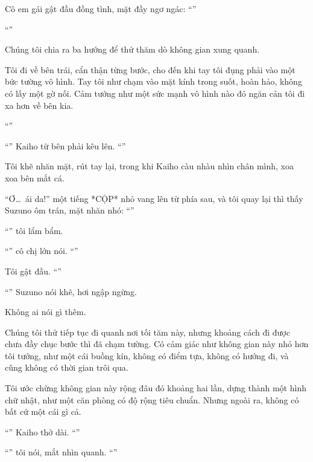 \documentclass[../main.tex]{subfiles}
\begin{document}
Cô em gái gật đầu đồng tình, mặt đầy ngơ ngác: ``''

``''

Chúng tôi chia ra ba hướng để thử thăm dò không gian xung quanh.

Tôi đi về bên trái, cẩn thận từng bước, cho đến khi tay tôi đụng phải vào một bức tường vô hình. Tay tôi như chạm vào mặt kính trong suốt, hoàn hảo, không có lấy một gờ nối. Cảm tưởng như một sức mạnh vô hình nào đó ngăn cản tôi đi xa hơn về bên kia.

``''

``'' Kaiho từ bên phải kêu lên. ``''

Tôi khẽ nhăn mặt, rút tay lại, trong khi Kaiho càu nhàu nhìn chân mình, xoa xoa bên mắt cá.

``Ơ\dots\ ái da!'' một tiếng *CỘP* nhỏ vang lên từ phía sau, và tôi quay lại thì thấy Suzuno ôm trán, mặt nhăn nhó: ``''

``'' tôi lẩm bẩm.

``'' cô chị lớn nói. ``''

Tôi gật đầu. ``''

``'' Suzuno nói khẽ, hơi ngập ngừng.

Không ai nói gì thêm.

Chúng tôi thử tiếp tục đi quanh nơi tối tăm này, nhưng khoảng cách đi được chưa đầy chục bước thì đã chạm tường. Có cảm giác như không gian này nhỏ hơn tôi tưởng, như một cái buồng kín, không có điểm tựa, không có hướng đi, và cũng không có thời gian trôi qua.

Tôi ước chừng không gian này rộng đâu đó khoảng hai lần, dựng thành một hình chữ nhật, như một căn phòng có độ rộng tiêu chuẩn. Nhưng ngoài ra, không có bất cứ một cái gì cả.

``'' Kaiho thở dài. ``''

``'' tôi nói, mắt nhìn quanh. ``''
\end{document}
